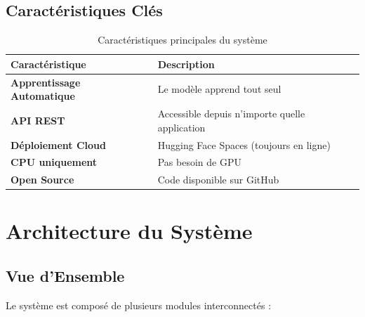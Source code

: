 \documentclass[12pt,a4paper]{report}
\begin{document}
\section{Caractéristiques Clés}

\begin{table}[H]
\centering
\renewcommand{\arraystretch}{1.5}
\begin{tabular}{>{\bfseries}l l}
\toprule
\textbf{Caractéristique} & \textbf{Description} \\
\midrule
Apprentissage Automatique & Le modèle apprend tout seul \\
API REST & Accessible depuis n'importe quelle application \\
Déploiement Cloud & Hugging Face Spaces (toujours en ligne) \\
CPU uniquement & Pas besoin de GPU \\
Open Source & Code disponible sur GitHub \\
\bottomrule
\end{tabular}
\caption{Caractéristiques principales du système}
\end{table}

\chapter{Architecture du Système}

\section{Vue d'Ensemble}

Le système est composé de plusieurs modules interconnectés :
\end{document}
